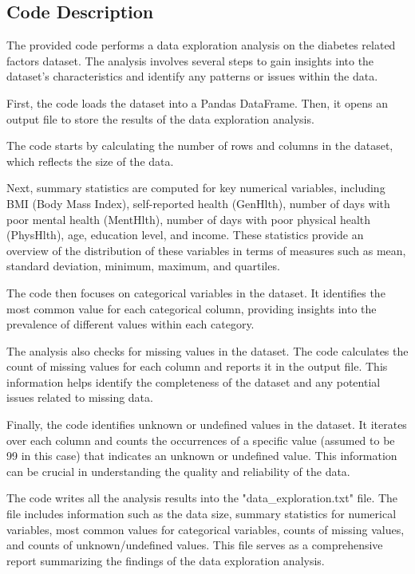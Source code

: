 \documentclass[11pt]{article}
\begin{document}
\subsection{Code Description}

The provided code performs a data exploration analysis on the diabetes related factors dataset. The analysis involves several steps to gain insights into the dataset's characteristics and identify any patterns or issues within the data.

First, the code loads the dataset into a Pandas DataFrame. Then, it opens an output file to store the results of the data exploration analysis.

The code starts by calculating the number of rows and columns in the dataset, which reflects the size of the data.

Next, summary statistics are computed for key numerical variables, including BMI (Body Mass Index), self-reported health (GenHlth), number of days with poor mental health (MentHlth), number of days with poor physical health (PhysHlth), age, education level, and income. These statistics provide an overview of the distribution of these variables in terms of measures such as mean, standard deviation, minimum, maximum, and quartiles.

The code then focuses on categorical variables in the dataset. It identifies the most common value for each categorical column, providing insights into the prevalence of different values within each category.

The analysis also checks for missing values in the dataset. The code calculates the count of missing values for each column and reports it in the output file. This information helps identify the completeness of the dataset and any potential issues related to missing data.

Finally, the code identifies unknown or undefined values in the dataset. It iterates over each column and counts the occurrences of a specific value (assumed to be 99 in this case) that indicates an unknown or undefined value. This information can be crucial in understanding the quality and reliability of the data.

The code writes all the analysis results into the "data\_exploration.txt" file. The file includes information such as the data size, summary statistics for numerical variables, most common values for categorical variables, counts of missing values, and counts of unknown/undefined values. This file serves as a comprehensive report summarizing the findings of the data exploration analysis.
\end{document}
